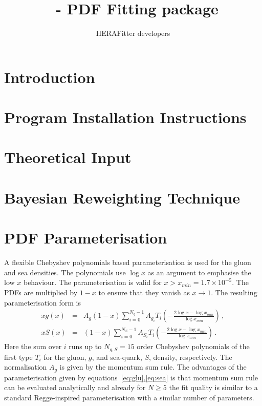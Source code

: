 \documentclass[11pt,a4paper]{article}
\title{\fitter\ - PDF Fitting package}
\author{HERAFitter developers}
\begin{document}
\maketitle
\begin{abstract}
\end{abstract}
\tableofcontents
\newpage
\section{Introduction}
  
\section{Program Installation Instructions} 

 
\section{Theoretical Input}


\section{Bayesian Reweighting Technique}
 
\section{PDF Parameterisation}


A flexible Chebyshev polynomials based parameterisation is used for the gluon and sea densities. The polynomials
use $\log x$ as an argument to emphasise the low $x$ behaviour. 
The parameterisation is valid for $x>x_{min} = 1.7\times 10^{-5}$. The PDFs are multiplied
by $1-x$ to ensure that they vanish as $x\to 1$. The resulting parameterisation form is 
\begin{eqnarray}
x g(x) &=& A_g \left(1-x\right) \sum_{i=0}^{N_g-1} A_{g_i} T_i \left(-\frac{\textstyle 2\log x - \log x_{min} } {\textstyle \log x_{min} } \right)\,, \label{eq:glu} \\
x S(x) &=& \left(1-x\right) \sum_{i=0}^{N_S-1} A_{S_i} T_i \left(-\frac{\textstyle 2\log x - \log x_{min} } {\textstyle \log x_{min} } \right)\,. \label{eq:sea} 
\end{eqnarray}
Here the sum over $i$ runs up to $N_{g,S}=15$ order Chebyshev polynomials of the first type $T_i$ for
the gluon, $g$, and sea-quark, $S$, density, respectively. 
The normalisation $A_g$ is given by the momentum sum rule.
The advantages of the parameterisation given by equations~\ref{eq:glu},\ref{eq:sea} is that momentum
sum rule can be evaluated analytically and  already for $N \ge 5$ the fit quality
is similar to a standard Regge-inspired parameterisation with a similar number of parameters.
\end{document}
